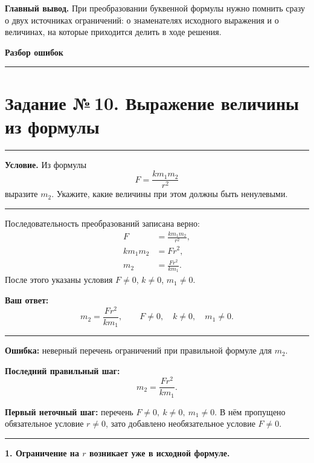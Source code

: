 \documentclass[a4paper,12pt]{article}
\newcommand{\accentline}{\par\noindent\textcolor{accent}{\rule{\linewidth}{0.45pt}}\par}
\newcommand{\reviewheading}[1]{\Needspace{8\baselineskip}\par\vspace{0.75em}{\large\bfseries\textcolor{darkaccent}{#1}}\par\accentline}
\newcommand{\field}[1]{\textbf{#1}}
\begin{document}
\vspace{9mm}
\textcolor{reviewblue}{\textbf{Главный вывод.}}
При преобразовании буквенной формулы нужно помнить сразу о двух источниках
ограничений: о знаменателях исходного выражения и о величинах, на которые
приходится делить в ходе решения.

\clearpage
\thispagestyle{plain}
\vspace*{\fill}
\begin{center}
  {\Huge\bfseries\textcolor{darkaccent}{Разбор ошибок}\par}
  \vspace{9mm}
  \textcolor{accent}{\rule{65mm}{0.7pt}}
\end{center}
\vspace*{\fill}
\clearpage

\label{task:10}
\section*{\textcolor{darkaccent}{Задание №\,10. Выражение величины из формулы}}
\accentline

\field{Условие.}
Из формулы
\[
  F=\frac{k m_1 m_2}{r^2}
\]
выразите \(m_2\). Укажите, какие величины при этом должны быть ненулевыми.

\reviewheading{Ваше решение}

Последовательность преобразований записана верно:
\[
\begin{aligned}
F&=\frac{k m_1 m_2}{r^2},\\
k m_1 m_2&=F r^2,\\
m_2&=\frac{F r^2}{k m_1}.
\end{aligned}
\]
После этого указаны условия \(F\ne0\), \(k\ne0\), \(m_1\ne0\).

\field{Ваш ответ:}
\[
m_2=\frac{F r^2}{k m_1},\qquad F\ne0,\quad k\ne0,\quad m_1\ne0.
\]

\reviewheading{Ошибка и её точное место}

\textcolor{reviewred}{\textbf{Ошибка:}} неверный перечень ограничений
при правильной формуле для \(m_2\).

\field{Последний правильный шаг:}
\[
  m_2=\frac{F r^2}{k m_1}.
\]

\field{Первый неточный шаг:} перечень \(F\ne0,\ k\ne0,\ m_1\ne0\).
В нём пропущено обязательное условие \(r\ne0\), зато добавлено
необязательное условие \(F\ne0\).

\reviewheading{Почему это неверно}

\textbf{1. Ограничение на \(r\) возникает уже в исходной формуле.}
\end{document}
